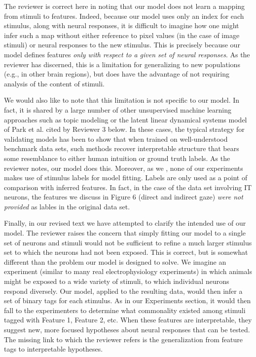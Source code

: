 \documentclass[12pt,a4paper]{article}
\newcommand{\edit}[1]{\textcolor{edit}{#1}}
\begin{document}
{\color{red}{I want to be really careful here. This is just a first stab.}}

\edit{
The reviewer is correct here in noting that our model does not learn a mapping from stimuli to features. Indeed, because our model uses only an index for each stimulus, along with neural responses, it is difficult to imagine how one might infer such a map without either reference to pixel values (in the case of image stimuli) or neural responses to the new stimulus. This is precisely because our model defines features \emph{only with respect to a given set of neural responses}. As the reviewer has discerned, this is a limitation for generalizing to new populations (e.g., in other brain regions), but does have the advantage of not requiring analysis of the content of stimuli.
}

\edit{
We would also like to note that this limitation is not specific to our model. In fact, it is shared by a large number of other unsupervised machine learning approaches such as topic modeling or the latent linear dynamical systems model of Park et al. cited by Reviewer 3 below. In these cases, the typical strategy for validating models has been to show that when trained on well-understood benchmark data sets, such methods recover interpretable structure that bears some resemblance to either human intuition or ground truth labels. As the reviewer notes, our model does this. Moreover, as we {\color{red}{have clarified in the text}}, none of our experiments makes use of stimulus labels for model fitting. Labels are only used as a point of comparison with inferred features. In fact, in the case of the data set involving IT neurons, the features we discuss in Figure 6 (direct and indirect gaze) \emph{were not provided} as lables in the original data set.
}

\edit{
Finally, in our revised text {\color{red} we have attempted to clarify} the intended use of our model. The reviewer raises the concern that simply fitting our model to a single set of neurons and stimuli would not be sufficient to refine a much larger stimulus set to which the neurons had not been exposed. This is correct, but is somewhat different than the problem our model is designed to solve. We imagine an experiment (similar to many real electrophysiology experiments) in which animals might be exposed to a wide variety of stimuli, to which individual neurons respond diversely. Our model, applied to the resulting data, would then infer a set of binary tags for each stimulus. As in our Experiments section, it would then fall to the experimenters to determine what commonality existed among stimuli tagged with Feature 1, Feature 2, etc. When these features are interpretable, they suggest new, more focused hypotheses about neural responses that can be tested. The missing link to which the reviewer refers is the generalization from feature tags to interpretable hypotheses.
}
\end{document}
